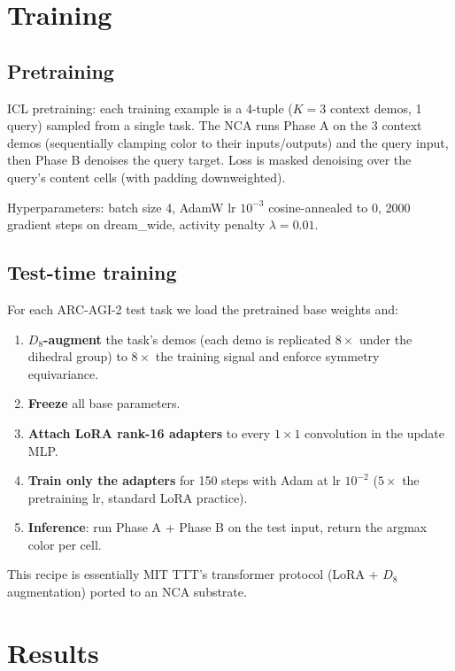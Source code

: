 \documentclass[11pt]{article}
\begin{document}
\section{Training}

\subsection{Pretraining}

ICL pretraining: each training example is a 4-tuple ($K=3$ context demos, 1 query) sampled from a single task. The NCA runs Phase A on the 3 context demos (sequentially clamping color to their inputs/outputs) and the query input, then Phase B denoises the query target. Loss is masked denoising over the query's content cells (with padding downweighted).

Hyperparameters: batch size 4, AdamW lr $10^{-3}$ cosine-annealed to 0, 2000 gradient steps on dream\_wide, activity penalty $\lambda = 0.01$.

\subsection{Test-time training}

For each ARC-AGI-2 test task we load the pretrained base weights and:
\begin{enumerate}
    \item \textbf{$D_8$-augment} the task's demos (each demo is replicated $8\times$ under the dihedral group) to $8\times$ the training signal and enforce symmetry equivariance.
    \item \textbf{Freeze} all base parameters.
    \item \textbf{Attach LoRA rank-16 adapters} \citep{hu2022lora} to every $1 \times 1$ convolution in the update MLP.
    \item \textbf{Train only the adapters} for 150 steps with Adam at lr $10^{-2}$ ($5\times$ the pretraining lr, standard LoRA practice).
    \item \textbf{Inference}: run Phase A + Phase B on the test input, return the argmax color per cell.
\end{enumerate}

This recipe is essentially MIT TTT's transformer protocol (LoRA + $D_8$ augmentation) ported to an NCA substrate.

\section{Results}
\end{document}
